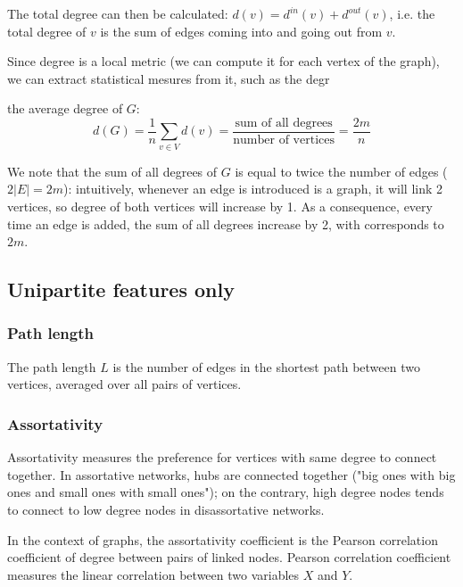 \documentclass[table]{report}
\begin{document}
The total degree can then be calculated: $d(v) = d^{in}(v) + d^{out}(v)$, i.e. the total degree of $v$ is the sum of edges coming into and going out from $v$.

Since degree is a local metric (we can compute it for each vertex of the graph), we can extract statistical mesures from it, such as the degr

the average degree of $G$: 
$$d(G) =  \dfrac{1}{n} \sum_{v \in V}^{} d(v) = \dfrac{\text{sum of all degrees}}{\text{number of vertices}} = \dfrac{2m}{n}$$

We note that the sum of all degrees of $G$ is equal to twice the number of edges ($2 |E| = 2m$): intuitively,  whenever an edge is introduced is a graph, it will link 2 vertices, so degree of both vertices will increase by 1. As a consequence, every time an edge is added, the sum of all degrees increase by 2, with corresponds to $2m$.

 

%


\subsection{Unipartite features only}


\subsubsection{Path length}

The path length $L$ is the number of edges in the shortest path between two vertices, averaged over all pairs of vertices.

\subsubsection{Assortativity}


Assortativity measures the preference for vertices with same degree to connect together. In assortative networks, hubs are connected together ("big ones with big ones and small ones with small ones"); on the contrary, high degree nodes tends to connect to low degree nodes in disassortative networks.

In the context of graphs, the assortativity coefficient is the Pearson correlation coefficient of degree between pairs of linked nodes. Pearson correlation coefficient measures the linear correlation between two variables $X$ and $Y$.
\end{document}
